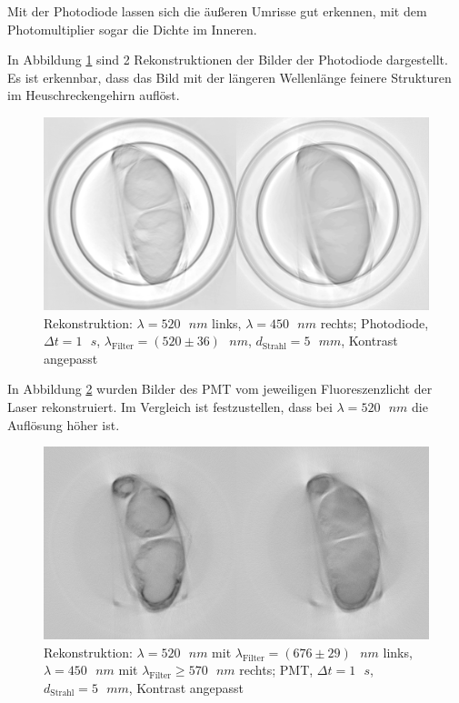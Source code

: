 Mit der Photodiode lassen sich die äußeren Umrisse gut erkennen, mit dem Photomultiplier sogar die Dichte im Inneren.

\begin{minipage}{\linewidth}
In Abbildung \ref{fig:both-pht} sind 2 Rekonstruktionen der Bilder der Photodiode dargestellt.
Es ist erkennbar, dass das Bild mit der längeren Wellenlänge feinere Strukturen im Heuschreckengehirn auflöst.
\begin{figure}[H]
\centering
\includegraphics[width=\linewidth]{IMAGE/2-pht-c.png}
\caption{Rekonstruktion: $\lambda = 520 \text{ } \si{nm}$ links, $\lambda = 450 \text{ } \si{nm}$ rechts; Photodiode, $\Delta{t} = 1 \text{ } \si{s}$, $\lambda_\text{Filter} = (520 \pm 36) \text{ } \si{nm}$, $d_\text{Strahl} = 5 \text{ } \si{mm}$, Kontrast angepasst}
	\label{fig:both-pht}
\end{figure}

In Abbildung \ref{fig:both-pmt} wurden Bilder des PMT vom jeweiligen Fluoreszenzlicht der Laser rekonstruiert. Im Vergleich ist festzustellen, dass bei $\lambda= 520 \text{ } \si{nm}$ die Auflösung höher ist.

\begin{figure}[H]
\centering
\includegraphics[width=\linewidth]{IMAGE/2-pmt-c.png}
\caption{Rekonstruktion: $\lambda = 520 \text{ } \si{nm}$ mit $\lambda_\text{Filter} = (676 \pm 29) \text{ } \si{nm}$ links,\\
	$\lambda = 450 \text{ } \si{nm}$ mit $\lambda_\text{Filter} \ge 570 \text{ } \si{nm}$ rechts; PMT, $\Delta{t} = 1 \text{ } \si{s}$,\\
$d_\text{Strahl} = 5 \text{ } \si{mm}$, Kontrast angepasst}
	\label{fig:both-pmt}
\end{figure}
\end{minipage}


